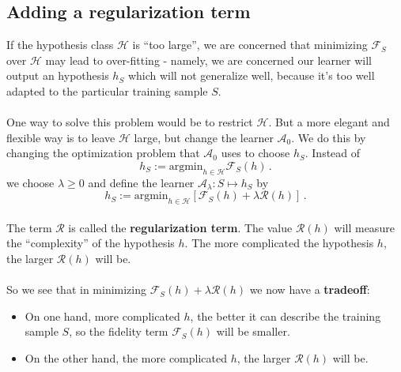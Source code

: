 \documentclass[11pt]{article}
\newcommand{\Ac}{\mathcal{A}}
\newcommand{\Rc}{\mathcal{R}}
\newcommand{\Fc}{\mathcal{F}}
\newcommand{\Hc}{\mathcal{H}}
\begin{document}
\subsection{Adding a regularization term}

If the hypothesis class $\Hc$ is ``too large'', we are concerned that minimizing
$\Fc_S$
over $\Hc$ may lead to over-fitting - namely, we are concerned our learner will
output 
 an hypothesis $h_S$ which will
not generalize well, because it's too well adapted to the particular training sample $S$.
\\~\\
One way to solve this problem would be to restrict $\Hc$. 
But a more elegant and flexible way is to leave $\Hc$ large, but change the learner
$\Ac_0$. We do this by changing the optimization problem that $\Ac_0$ uses to choose
$h_S$. Instead of 
\[
  h_S := \text{argmin}_{h\in\Hc} \Fc_S(h)\,.
\]
we choose $\lambda\geq 0$ and define the learner $\Ac_\lambda:S\mapsto h_S$ by
\[
  h_S := \text{argmin}_{h\in\Hc}\left[ \Fc_S(h)+  \lambda \Rc(h)\right] \,.
\]
~\\
The term $\Rc$ is called the {\bf regularization term}. The value $\Rc(h)$ will measure the
``complexity'' of the hypothesis $h$. The more complicated the hypothesis $h$,
the larger $\Rc(h)$ will be. 
\\~\\
So we see that in minimizing $ \Fc_S(h)+ \lambda \Rc(h)$ we now have a
{\bf tradeoff}:
\begin{itemize}
  \item On one hand, more complicated $h$, the better it can describe the
    training sample $S$, so the fidelity term $\Fc_S(h)$ will be smaller.
  \item On the other hand, the more complicated $h$, the larger $\Rc(h)$ will
    be. 
\end{itemize}
\end{document}
